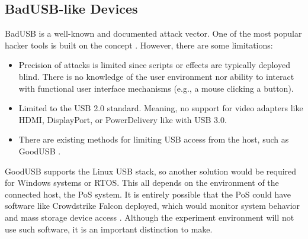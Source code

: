 \subsection{BadUSB-like Devices}
BadUSB is a well-known and documented attack vector. One of the most popular hacker tools is built on the concept \autocite{hak5BashBunny}. However, there are some limitations:

\begin{itemize}
  \item Precision of attacks is limited since scripts or effects are typically deployed blind. There is no knowledge of the user environment nor ability to interact with functional user interface mechanisms (e.g., a mouse clicking a button). 
  \item Limited to the USB 2.0 standard. Meaning, no support for video adapters like HDMI, DisplayPort, or PowerDelivery like with USB 3.0. 
  \item There are existing methods for limiting USB access from the host, such as GoodUSB \autocite{tianDefendingMaliciousUSB2015}.
\end{itemize}

GoodUSB supports the Linux USB stack, so another solution would be required for Windows systems or RTOS. This all depends on the environment of the connected host, the PoS system. It is entirely possible that the PoS could have software like Crowdstrike Falcon deployed, which would monitor system behavior and mass storage device access \autocite{backer2021sdn}. Although the experiment environment will not use such software, it is an important distinction to make.


